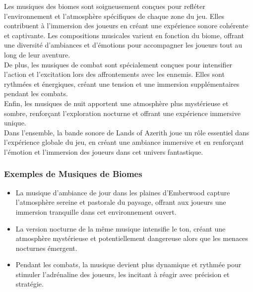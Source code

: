 Les musiques des biomes sont soigneusement conçues pour refléter l'environnement et l'atmosphère spécifiques de chaque zone du jeu. Elles contribuent à l'immersion des joueurs en créant une expérience sonore cohérente et captivante. 
Les compositions musicales varient en fonction du biome, offrant une diversité d'ambiances et d'émotions pour accompagner les joueurs tout au long de leur aventure.
\\

De plus, les musiques de combat sont spécialement conçues pour intensifier l'action et l'excitation lors des affrontements avec les ennemis. 
Elles sont rythmées et énergiques, créant une tension et une immersion supplémentaires pendant les combats.
\\

Enfin, les musiques de nuit apportent une atmosphère plus mystérieuse et sombre, renforçant l'exploration nocturne et offrant une expérience immersive unique.
\\

Dans l'ensemble, la bande sonore de Lands of Azerith joue un rôle essentiel dans l'expérience globale du jeu, en créant une ambiance immersive et en renforçant l'émotion et l'immersion des joueurs dans cet univers fantastique.

\subsubsection{Exemples de Musiques de Biomes}

\begin{itemize}

      \item La musique d'ambiance de jour dans les plaines d'Emberwood capture l'atmosphère sereine et pastorale du paysage, offrant aux joueurs une immersion tranquille dans cet environnement ouvert.
            \\

      \item La version nocturne de la même musique intensifie le ton, créant une atmosphère mystérieuse et potentiellement dangereuse alors que les menaces nocturnes émergent.
            \\

      \item Pendant les combats, la musique devient plus dynamique et rythmée pour stimuler l'adrénaline des joueurs, les incitant à réagir avec précision et stratégie.
            \\

\end{itemize}

